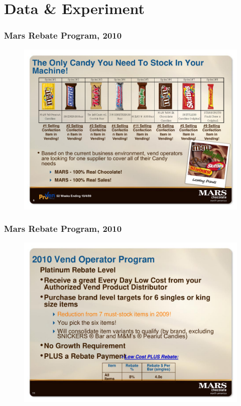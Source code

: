\section{Data \& Experiment}

\begin{frame}
\frametitle{Mars Rebate Program, 2010}
\begin{figure}
\begin{center}
\includegraphics[width=.95\linewidth]{rebate1.pdf}\\
\label{fig:marsslides}
\end{center}
\end{figure}
\end{frame}

\begin{frame}
\frametitle{Mars Rebate Program, 2010}
\begin{figure}
\begin{center}
\includegraphics[width=.95\linewidth]{rebate3.pdf}\\
\label{fig:marsslides}
\end{center}
\end{figure}
\end{frame}


